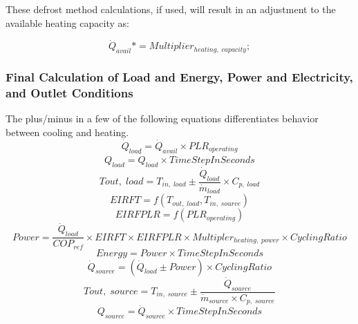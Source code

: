 These defrost method calculations, if used, will result in an adjustment to the available heating capacity as:

\begin{equation}
\dot{Q}_{avail} *= Multiplier_{heating,\; capacity};
\end{equation}

\subsubsection{Final Calculation of Load and Energy, Power and Electricity, and Outlet Conditions}\label{eir-air-to-water-heat-pumps-final-calculations}
The plus/minus in a few of the following equations differentiates behavior between cooling and heating.
\begin{equation}
\dot{Q}_{load} = \dot{Q}_{avail} \times PLR_{operating}
\end{equation}
\begin{equation}
{Q}_{load} = \dot{Q}_{load} \times TimeStepInSeconds
\end{equation}
\begin{equation}
T{out,\;load} = T_{in,\;load} \pm \frac{\dot{Q}_{load}}{\dot{m}_{load}} \times C_{p,\;load}
\end{equation}
\begin{equation}
EIRFT = {f(T_{out,\;load}, T_{in,\;source})}
\end{equation}
\begin{equation}
EIRFPLR = {f(PLR_{operating})}
\end{equation}
\begin{equation}
Power = \frac{\dot{Q}_{load}}{COP_{ref}} \times EIRFT \times EIRFPLR \times Multipler_{heating,\; power} \times CyclingRatio
\end{equation}
\begin{equation}
Energy = Power \times TimeStepInSeconds
\end{equation}
\begin{equation}
{\dot{Q}_{source} = (\dot{Q}_{load} \pm Power) \times CyclingRatio}
\end{equation}
\begin{equation}
T{out,\;source} = T_{in,\;source} \pm \frac{\dot{Q}_{source}}{\dot{m}_{source} \times C_{p,\;source}}
\end{equation}
\begin{equation}
{Q}_{source} = \dot{Q}_{source} \times TimeStepInSeconds
\end{equation}

